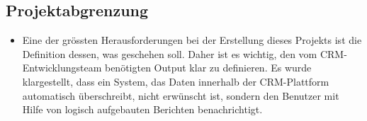 \subsection{Projektabgrenzung} 
\label{sec:Projektabgrenzung}
\begin{itemize}
	\item Eine der gr\"o{ss}ten Herausforderungen bei der Erstellung dieses Projekts ist die Definition dessen, was geschehen soll.
	Daher ist es wichtig, den vom CRM-Entwicklungsteam ben\"otigten Output klar zu definieren. 
	Es wurde klargestellt, dass ein System, das Daten innerhalb der CRM-Plattform automatisch \"uberschreibt, nicht erw\"unscht ist, sondern den Benutzer mit Hilfe von logisch aufgebauten Berichten benachrichtigt.
\end{itemize}
